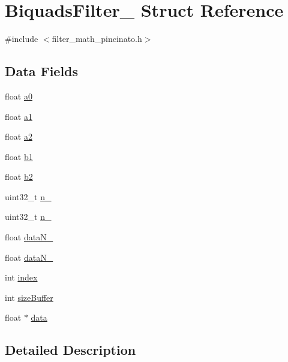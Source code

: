 \hypertarget{struct_biquads_filter__}{}\section{Biquads\+Filter\+\_\+ Struct Reference}
\label{struct_biquads_filter__}


{\ttfamily \#include $<$filter\+\_\+math\+\_\+pincinato.\+h$>$}

\subsection*{Data Fields}
\begin{DoxyCompactItemize}
\item 
float \mbox{\hyperlink{struct_biquads_filter___a9404ccf1a95542ac80c0609271af0fb2}{a0}}
\item 
float \mbox{\hyperlink{struct_biquads_filter___ad36c8f7a507294aa8f53bb0baf28fb24}{a1}}
\item 
float \mbox{\hyperlink{struct_biquads_filter___a0a9ef35b787a9d8a73482c238d0177c4}{a2}}
\item 
float \mbox{\hyperlink{struct_biquads_filter___a0a909289ec9fbfaa70c0e112ec9e3b15}{b1}}
\item 
float \mbox{\hyperlink{struct_biquads_filter___a746bcb222044619e5a9b335d242a2a92}{b2}}
\item 
uint32\+\_\+t \mbox{\hyperlink{struct_biquads_filter___a9a75882f4d97ed1dd488c82d0e2d0b49}{n\+\_}}
\item 
uint32\+\_\+t \mbox{\hyperlink{struct_biquads_filter___a4cf80dc616ab6710704604ec8d383be9}{n\+\_}}
\item 
float \mbox{\hyperlink{struct_biquads_filter___a119889217f4c543e1bd3e357dc524dd9}{data\+N\+\_}}
\item 
float \mbox{\hyperlink{struct_biquads_filter___aca30abf2784d353ab26625daca7a030e}{data\+N\+\_}}
\item 
int \mbox{\hyperlink{struct_biquads_filter___a750b5d744c39a06bfb13e6eb010e35d0}{index}}
\item 
int \mbox{\hyperlink{struct_biquads_filter___a145948232f729807d798ee4339711815}{size\+Buffer}}
\item 
float $\ast$ \mbox{\hyperlink{struct_biquads_filter___a57ba9c584cf7756552b7d4370e93395f}{data}}
\end{DoxyCompactItemize}


\subsection{Detailed Description}


